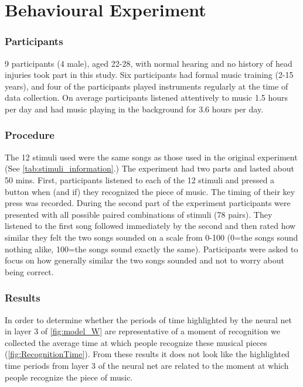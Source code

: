 \chapter*{Behavioural Experiment}
\subsection*{Participants}
9 participants (4 male), aged 22-28, with normal hearing and no history of head injuries took part in this study. Six participants had formal music training (2-15 years), and four of the participants played instruments regularly at the time of data collection. On average participants listened attentively to music 1.5 hours per day and had music playing in the background for 3.6 hours per day. 
\subsection*{Procedure}
The 12 stimuli used were the same songs as those used in the original experiment (See \autoref{tab:stimuli_information}.)
The experiment had two parts and lasted about 50 mins.
First, participants listened to each of the 12 stimuli and pressed a button when (and if) they recognized the piece of music.
The timing of their key press was recorded. 
During the second part of the experiment participants were presented with all possible paired combinations of stimuli (78 pairs). 
They listened to the first song followed immediately by the second and then rated how similar they felt the two songs sounded on a scale from 0-100 (0=the songs sound nothing alike, 100=the songs sound exactly the same).
Participants were asked to focus on how generally similar the two songs sounded and not to worry about being correct.

\subsection*{Results}
In order to determine whether the periods of time highlighted by the neural net in layer 3 of \autoref{fig:model_W} are representative of a moment of recognition we collected the average time at which people recognize these musical pieces (\autoref{fig:RecognitionTime}). 
From these results it does not look like the highlighted time periods from layer 3 of the neural net are related to the moment at which people recognize the piece of music. 

